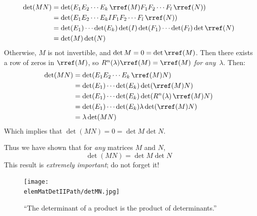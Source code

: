 \begin{align*}
\det (MN) & = \det (E_1E_2\cdots E_k\,  \rref(M) F_1F_2\cdots F_l \, \rref(N) )\\
& = \det (E_1E_2\cdots E_k I F_1F_2\cdots F_l\,  \rref(N) )\\
& = \det (E_1) \cdots \det(E_k)\det(I)\det(F_1)\cdots\det(F_l)\det\rref(N)\\
& = \det(M)\det(N)
\end{align*}
Otherwise, $M$ is not invertible, and $\det M=0=\det 
\rref(M)$.  Then there exists a row of zeros in $
\rref(M)$, so $R^n(\lambda)
\rref(M)=
\rref(M)$ {\itshape for any~$\lambda$}.  Then:
\begin{align*}
\det (MN)
& = \det (E_1E_2\cdots E_k \, \rref(M) N )\\
& = \det (E_1) \cdots \det(E_k)\det( \rref(M)N)\\
& = \det (E_1) \cdots \det(E_k)\det( R^n(\lambda) \, \rref(M)N)\\
& = \det (E_1) \cdots \det(E_k)\lambda \det( \rref(M)N)\\
& = \lambda \det (MN)
\end{align*}
Which implies that $\det (MN)=0=\det M \det N$.

Thus we have shown that for {\itshape any} matrices $M$ and $N$, 
\label{detmultiplicative}
\[
\det (MN) = \det M \det N
\]
This result is {\itshape extremely important}; do not forget it!


\begin{figure}
\begin{center}
\texttt{[image: \\elemMatDetIIPath/detMN.jpg]}
\end{center}
\caption{``The determinant of a product is the product of determinants.''}
\end{figure}







